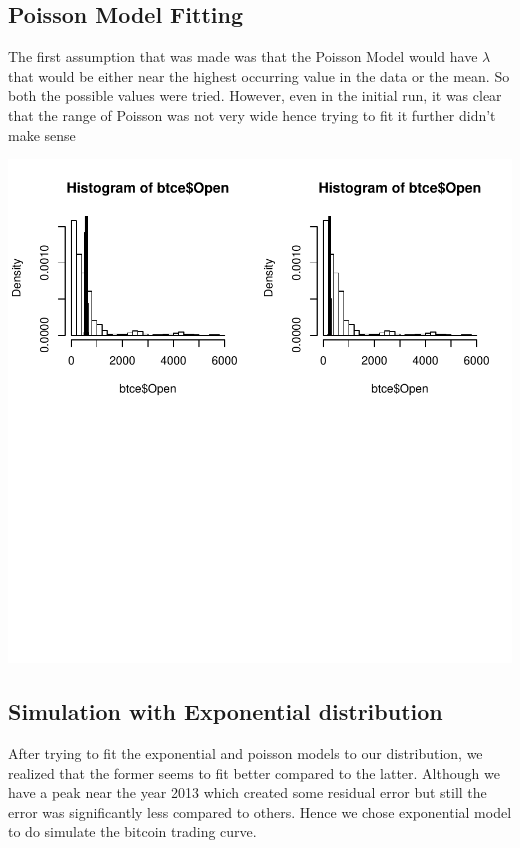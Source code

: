 \documentclass{article}
\begin{document}
\subsection{Poisson Model Fitting}
The first assumption that was made was that the Poisson Model would have $\lambda$ that would be either near the highest occurring value in the data or the mean. So both the possible values were tried. However, even in the initial run, it was clear that the range of Poisson was not very wide hence trying to fit it further didn't make sense
\begin{Schunk}
\end{Schunk}
\includegraphics{Report-004}

\subsection{Simulation with Exponential distribution}
After trying to fit the exponential and poisson models to our distribution, we realized that the former seems to fit better compared to the latter. Although we have a peak near the year 2013 which created some residual error but still the error was significantly less compared to others. Hence we chose exponential model to do simulate the bitcoin trading curve.
\end{document}
